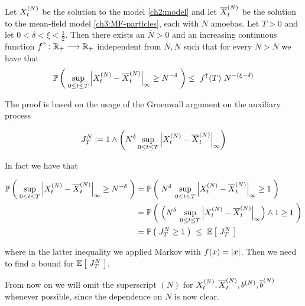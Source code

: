 \label{ch6}

\begin{proposition}\label{ch6:final-result}
	Let $X_t^{(N)}$ be the solution to the model \ref{ch2:model} and let $\overline{X}_t^{(N)}$ be the solution to the mean-field model \ref{ch3:MF-particles}, each with $N$ amoebas.
	Let $T > 0$ and let $0< \delta <\xi <\frac{1}{2}$.
	Then there exists an $\overline{N}>0$ and an increasing continuous function $f^\uparrow: \mathbb{R}_+ \longrightarrow \mathbb{R}_+$ independent from $\overline{N},N$ such that for every $N > \overline{N}$ we have that
	\begin{equation}
		\mathbb{P} \left( \;   
			\sup_{0 \leq t \leq T}
			{ \left| 
				X_t^{(N)} - \overline{X}_t^{(N)}
			 \right|_{\infty} } 
			\geq
			N^{-\delta}
		 \; \right)
		\leq\
		f^\uparrow(T)\
		N^{-(\xi-\delta)}
	\end{equation}
\end{proposition}

The proof is based on the usage of the Groenwall argument on the auxiliary process 

\begin{equation}
	J_T^N := 1 \wedge \left( 
	N^{\delta}
	\sup_{0 \leq t \leq T}
	{ \left| 
		X_t^{(N)} - \overline{X}_t^{(N)}
	 \right|_{\infty} } \right)
\end{equation}

In fact we have that

	\begin{align*}
	\mathbb{P} \left( \;   
		\sup_{0 \leq t \leq T}
		{ \left| 
			X_t^{(N)} - \overline{X}_t^{(N)}
		 \right|_{\infty} } 
		\geq
		N^{-\delta}
	 \; \right)
	&=
	\mathbb{P} \left( \;   
		N^{\delta}\:
		\sup_{0 \leq t \leq T}
		{ \left| 
			X_t^{(N)} - \overline{X}_t^{(N)}
		 \right|_{\infty} } 
		\geq
		1
	 \; \right)
	\\
	&=
	\mathbb{P} \left( \;   
		\Big(
		N^{\delta}\:
		\sup_{0 \leq t \leq T}
		{ \left| 
			X_t^{(N)} - \overline{X}_t^{(N)}
		 \right|_{\infty} } 
		\Big)
		\wedge
		1
		\geq
		1
	 \; \right)
	\\
	&=
	\mathbb{P} \left( \;   
		J_T^N
		\geq
		1
	 \; \right)\
	\leq\
	\mathbb{E} \left[ \;  
		J_T^N
	 \; \right] 
\end{align*}

where in the latter inequality we applied Markov with $f(x) = \left| x \right|$.
Then we need to find a bound for $\mathbb{E} \left[ \; J_T^N \; \right] $.

\begin{remark}
	From now on we will omit the superscript $(N)$ for $X_t^{(N)},\overline{X}_t^{(N)}, b^{(N)}, \overline{b}^{(N)}$ whenever possible, since the dependence on $N$ is now clear.
\end{remark}

